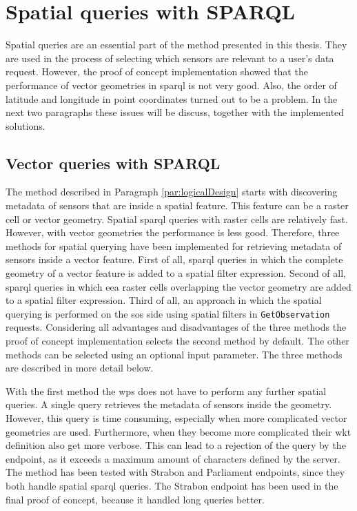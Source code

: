 \section{Spatial queries with SPARQL}
\label{par:spQueries}
Spatial queries are an essential part of the method presented in this thesis. They are used in the process of selecting which sensors are relevant to a user's data request. However, the proof of concept implementation showed that the performance of vector geometries in \ac{sparql} is not very good. Also, the order of latitude and longitude in point coordinates turned out to be a problem. In the next two paragraphs these issues will be discuss, together with the implemented solutions.     

\subsection{Vector queries with SPARQL}
The method described in Paragraph \ref{par:logicalDesign} starts with discovering metadata of sensors that are inside a spatial feature. This feature can be a raster cell or vector geometry. Spatial \ac{sparql} queries with raster cells are relatively fast. However, with vector geometries the performance is less good. Therefore, three methods for spatial querying have been implemented for retrieving metadata of sensors inside a vector feature. First of all, \ac{sparql} queries in which the complete geometry of a vector feature is added to a spatial filter expression. Second of all, \ac{sparql} queries in which \ac{eea} raster cells overlapping the vector geometry are added to a spatial filter expression. Third of all, an approach in which the spatial querying is performed on the \ac{sos} side using spatial filters in \texttt{GetObservation} requests. Considering all advantages and disadvantages of the three methods the proof of concept implementation selects the second method by default. The other methods can be selected using an optional input parameter. The three methods are described in more detail below.

With the first method the \ac{wps} does not have to perform any further spatial queries. A single query retrieves the metadata of sensors inside the geometry. However, this query is time consuming, especially when more complicated vector geometries are used. Furthermore, when they become more complicated their \ac{wkt} definition also get more verbose. This can lead to a rejection of the query by the endpoint, as it exceeds a maximum amount of characters defined by the server. The method has been tested with Strabon and Parliament endpoints, since they both handle spatial \ac{sparql} queries. The Strabon endpoint has been used in the final proof of concept, because it handled long queries better.   

